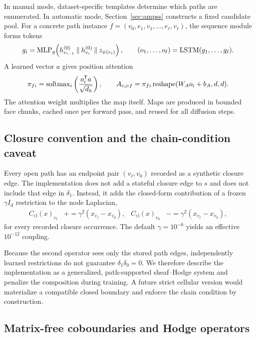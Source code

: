 In manual mode, dataset-specific templates determine which paths are enumerated. In automatic
mode, Section~\ref{sec:ampss} constructs a fixed candidate pool. For a concrete path instance
$f=(v_0,e_1,v_1,\ldots,e_\ell,v_\ell)$, the sequence module forms tokens
\begin{equation}
  g_i=\operatorname{MLP}_{g}\!
  \left(h_{v_{i-1}}^{(0)}\mathbin\Vert h_{v_i}^{(0)}\mathbin\Vert z_{\psi(e_i)}\right),
  \qquad (o_1,\ldots,o_\ell)=\operatorname{LSTM}(g_1,\ldots,g_\ell).
\end{equation}
A learned vector $a$ gives position attention
\begin{equation}
  \pi_{fi}=\operatorname{softmax}_{i}\left(\frac{o_i^{\mathsf{T}}a}{\sqrt{d_h}}\right),
  \qquad
  A_{e_i\triangleright f}=\pi_{fi}\operatorname{reshape}(W_Ao_i+b_A,d,d).
  \label{eq:face-map}
\end{equation}
The attention weight multiplies the map itself. Maps are produced in bounded face chunks, cached
once per forward pass, and reused for all diffusion steps.

\subsection{Closure convention and the chain-condition caveat}
\label{sec:closure}

Every open path has an endpoint pair $(v_\ell,v_0)$ recorded as a synthetic closure edge. The
implementation does not add a stateful closure edge to $s$ and does not include that edge in
$\delta_1$. Instead, it adds the closed-form contribution of a frozen $\gamma I_d$ restriction to
the node Laplacian,
\begin{align}
  C_{\mathrm{cl}}(x)_{v_\ell} &\mathrel{+}=\gamma^2(x_{v_\ell}-x_{v_0}), &
  C_{\mathrm{cl}}(x)_{v_0} &\mathrel{-}=\gamma^2(x_{v_\ell}-x_{v_0}),
  \label{eq:closure}
\end{align}
for every recorded closure occurrence. The default $\gamma=10^{-6}$ yields an effective
$10^{-12}$ coupling.

Because the second operator sees only the stored path edges, independently learned restrictions do
not guarantee $\delta_1\delta_0=0$. We therefore describe the implementation as a generalized,
path-supported sheaf--Hodge system and penalize the composition during training. A future strict
cellular version would materialize a compatible closed boundary and enforce the chain condition by
construction.

\subsection{Matrix-free coboundaries and Hodge operators}

